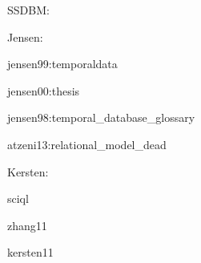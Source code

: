 
SSDBM:

\cite{dreyer94b}


Jensen:

jensen99:temporaldata

jensen00:thesis

jensen98:temporal_database_glossary

atzeni13:relational_model_dead

Kersten:

sciql

zhang11

kersten11